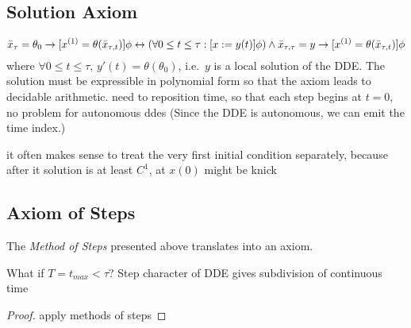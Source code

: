 \documentclass[10pt]{report}
\begin{document}
    \subsection{Solution Axiom}
        \label{sec:solution-axiom}
        \begin{equation}
            \xbartau = \theta_0 \rightarrow [\D{x}=\theta(\xbartaut{t})]\phi
            \leftrightarrow
            \left(\forall 0\leq t\leq\tau: [x:= y(t)]\phi \right)
            \wedge \xbartaut{\tau} = y \rightarrow [\D{x}=\theta (\xbartaut{t})]\phi
        \end{equation}
        where $\forall 0\leq t\leq\tau$, $y'(t)=\theta(\theta_0)$, i.e.\ $y$ is a local solution of the DDE. The solution must be expressible in polynomial form so that the axiom leads to decidable arithmetic.
        need to reposition time, so that each step begins at $t=0$, no problem for autonomous ddes
        (Since the DDE is autonomous, we can emit the time index.)

it often makes sense to treat the very first initial condition separately, because after it solution is at least $C^1$, at $x(0)$ might be knick

    \subsection{Axiom of Steps}
        \label{sec:axiom-of-steps}

        The \emph{Method of Steps} presented above translates into an axiom.

        \begin{calculus}


        \end{calculus}

        What if $T=t_{max} < \tau$?
        Step character of DDE gives subdivision of continuous time

        \begin{proof}
            apply methods of steps
        \end{proof}
\end{document}

